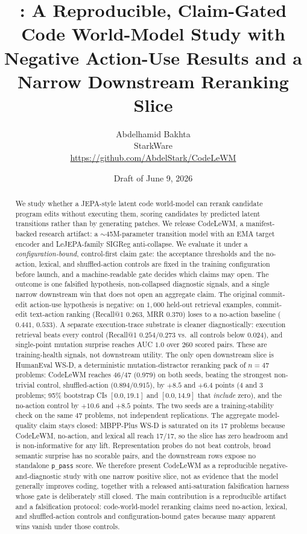 \documentclass[11pt]{article}
\title{\modelname{}: A Reproducible, Claim-Gated Code World-Model Study with
  Negative Action-Use Results and a Narrow Downstream Reranking Slice}
\author{
  Abdelhamid Bakhta\\
  StarkWare\\
  \url{https://github.com/AbdelStark/CodeLeWM}
}
\date{Draft of June 9, 2026}
\newcommand{\code}[1]{\texttt{#1}}
\newcommand{\modelname}{CodeLeWM}
\begin{document}
\maketitle

\begin{abstract}
We study whether a JEPA-style latent code world-model can rerank candidate
program edits without executing them, scoring candidates by predicted latent
transitions rather than by generating patches. We release \modelname{}, a
manifest-backed research artifact: a $\sim$45M-parameter transition model with
an EMA target encoder and LeJEPA-family SIGReg anti-collapse. We evaluate it
under a \emph{configuration-bound}, control-first claim gate: the acceptance
thresholds and the no-action, lexical, and shuffled-action controls are fixed in
the training configuration before launch, and a machine-readable gate decides
which claims may open. The outcome is one falsified hypothesis, non-collapsed
diagnostic signals, and a single narrow downstream win that does not open an
aggregate claim. The original commit-edit action-use hypothesis is negative: on
$1{,}000$ held-out retrieval examples, commit-edit text-action ranking
(Recall@1 $0.263$, MRR $0.370$) loses to a no-action baseline ($0.441$,
$0.533$). A separate execution-trace substrate is cleaner diagnostically:
execution retrieval beats every control (Recall@1 $0.254$/$0.273$ vs.\ all
controls below $0.024$), and single-point mutation surprise reaches AUC $1.0$
over $260$ scored pairs. These are training-health signals, not downstream
utility. The only open downstream slice is HumanEval WS-D, a deterministic
mutation-distractor reranking pack of $n=47$ problems: \modelname{} reaches
$46/47$ ($0.979$) on both seeds, beating the strongest non-trivial control,
shuffled-action ($0.894$/$0.915$), by $+8.5$ and $+6.4$ points (4 and 3
problems; 95\% bootstrap CIs $[0.0,19.1]$ and $[0.0,14.9]$ that \emph{include}
zero), and the no-action control by $+10.6$ and $+8.5$ points. The two seeds are
a training-stability check on the same $47$ problems, not independent
replications. The aggregate model-quality claim stays closed: MBPP-Plus WS-D is
saturated on its $17$ problems because \modelname{}, no-action, and lexical all
reach $17/17$, so the slice has zero headroom and is non-informative for any
lift. Representation probes do not beat controls, broad semantic surprise has no
scorable pairs, and the downstream rows expose no standalone \code{p\_pass}
score. We therefore present \modelname{} as a reproducible
negative-and-diagnostic study with one narrow positive slice, not as evidence
that the model generally improves coding, together with a released
anti-saturation falsification harness whose gate is deliberately still closed.
The main contribution is a reproducible artifact and a falsification protocol:
code-world-model reranking claims need no-action, lexical, and shuffled-action
controls and configuration-bound gates because many apparent wins vanish under
those controls.
\end{abstract}
\end{document}
